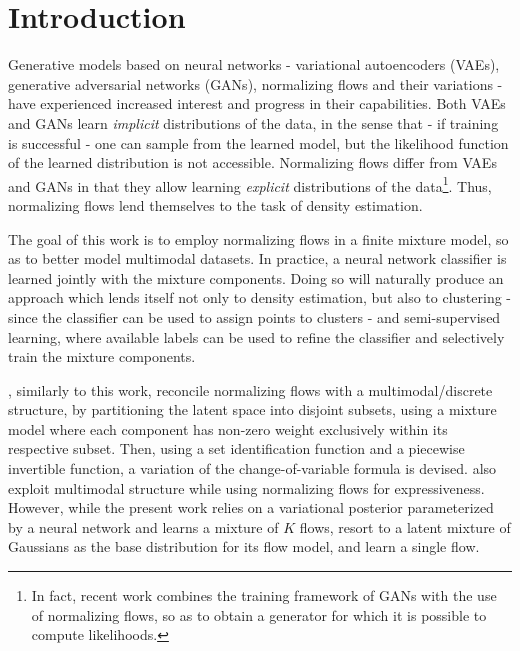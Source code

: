 \section{Introduction}
\label{section:introduction}

Generative models based on neural networks - variational autoencoders (VAEs),
generative adversarial networks (GANs), normalizing flows and their variations -
have experienced increased interest and progress in their capabilities. Both VAEs and GANs learn
\emph{implicit} distributions of the data, in the sense that - if training is
successful - one can sample from the learned model, but the likelihood function
of the learned distribution is not accessible. Normalizing flows differ from VAEs
and GANs in that they allow learning \emph{explicit} distributions of the
data\footnote{In fact, recent work \autocite{flowgan} combines the training
framework of GANs with the use of normalizing flows, so as to obtain a generator
for which it is possible to compute likelihoods.}. Thus, normalizing flows lend
themselves to the task of density estimation.

The goal of this work is to employ normalizing flows in a finite mixture model, 
so as to better model multimodal datasets. In practice, a neural network classifier
is learned jointly with the mixture components. Doing so will naturally produce
an approach which lends itself not only to density estimation, but also to
clustering - since the classifier can be used to assign points to clusters - and
semi-supervised learning, where available labels can be used to refine the classifier
and selectively train the mixture components.

\textcite{RAD}, similarly to this work, reconcile normalizing flows with a
multimodal/discrete structure, by partitioning the latent space into disjoint
subsets, using a mixture model where each component has non-zero weight
exclusively within its respective subset. Then, using a set identification
function and a piecewise invertible function, a variation of the change-of-variable
formula is devised.
\textcite{semisuplearning_nflows} also exploit multimodal structure while
using normalizing flows for expressiveness. However, while the present work relies on
a variational posterior parameterized by a neural network and learns a mixture of $K$ flows,
\textcite{semisuplearning_nflows} resort to a
latent mixture of Gaussians as the base distribution for its flow model, and
learn a single flow.
